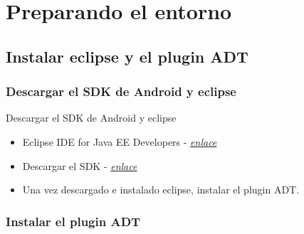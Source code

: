 \section{Preparando el entorno}

\subsection{Instalar eclipse y el plugin ADT}

\subsubsection{Descargar el SDK de Android y eclipse}

\begin{frame}{Descargar el SDK de Android y eclipse}{}
  \begin{itemize}
  \item {
    Eclipse IDE for Java EE Developers - \href{http://www.eclipse.org/downloads/packages/eclipse-ide-java-ee-developers/keplersr2}{\textit{enlace}}
  }
  \item {
    Descargar el SDK - \href{http://developer.android.com/sdk/index.html\#ExistingIDE}{\textit{enlace}}
  }
  \item{
    Una vez descargado e instalado eclipse, instalar el plugin ADT.
  }
  \end{itemize}
\end{frame}

\subsubsection{Instalar el plugin ADT}

